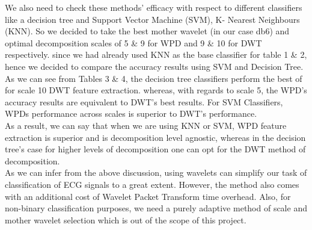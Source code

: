 \documentclass[10pt,twocolumn,letterpaper]{article}
\begin{document}
\begin{table}[htbp]
\caption{Decision Tree - Classification Accuracy :- \\ DWT vs WPD}
\label{tab:caption}
\end{table}
We also need to check these methods' efficacy with respect to different classifiers like a decision tree and Support Vector Machine (SVM), K- Nearest Neighbours (KNN). So we decided to take the best mother wavelet (in our case db6) and optimal decomposition scales of 5 \& 9 for WPD and 9 \& 10 for DWT respectively.
since we had already used KNN as the base classifier for table 1 \& 2, hence we decided to compare the accuracy results using SVM and Decision Tree.\\
As we can see from Tables 3 \& 4, the decision tree classifiers perform the best of for scale 10 DWT feature extraction. whereas, with regards to scale 5, the WPD's accuracy results are equivalent to DWT's best results. For SVM Classifiers, WPDs performance across scales is superior to DWT's performance.\\
As a result, we can say that when we are using KNN or SVM, WPD feature extraction is superior and is decomposition level agnostic, whereas in the decision tree's case for higher levels of decomposition one can opt for the DWT method of decomposition.\\
As we can infer from the above discussion, using wavelets can simplify our task of classification of ECG signals to a great extent. However, the method also comes with an additional cost of Wavelet Packet Transform time overhead. Also, for non-binary classification purposes, we need a purely adaptive method of scale and mother wavelet selection which is out of the scope of this project.
\end{document}
